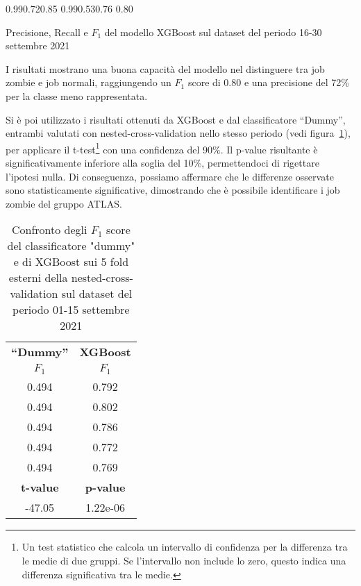 \begin{table}[!ht]
   \centering
   \scores%
   {0.99}{0.72}{0.85}%
   {0.99}{0.53}{0.76}%
   {0.80}
   \caption{\small Precisione, Recall e $F_1$ del modello XGBoost sul dataset del
   periodo 16-30 settembre 2021}
   \label{table:scores_xgboost_sep2021}
\end{table}

I risultati mostrano una buona capacità del modello nel distinguere tra job
zombie e job normali, raggiungendo un $F_1$ score di 0.80 e una precisione del
72\% per la classe meno rappresentata. 

Si è poi utilizzato i risultati ottenuti da XGBoost e dal classificatore
``Dummy'', entrambi valutati con nested-cross-validation nello stesso periodo
(vedi figura~\ref{table:nested_cv_f1_scores_sep2021}), per applicare il
t-test\footnote{Un test statistico che calcola un intervallo di confidenza per
la differenza tra le medie di due gruppi. Se l'intervallo non include lo zero,
questo indica una differenza significativa tra le medie.} con una confidenza
del 90\%. Il p-value risultante è significativamente inferiore alla soglia del
10\%, permettendoci di rigettare l'ipotesi nulla. Di conseguenza, possiamo
affermare che le differenze osservate sono statisticamente significative,
dimostrando che è possibile identificare i job zombie del gruppo ATLAS.

\begin{table}[!ht]
    \centering
    \begin{tabular}{cc}
        \toprule
        \textbf{``Dummy''} & \textbf{XGBoost} \\  
        $F_1$ & $F_1$ \\ 
        \midrule
        0.494 & 0.792 \\
        0.494 & 0.802 \\
        0.494 & 0.786 \\
        0.494 & 0.772 \\
        0.494 & 0.769 \\
        \midrule 
        \textbf{t-value} & \textbf{p-value} \\ 
        \midrule
        -47.05 & 1.22e-06 \\
        \bottomrule
    \end{tabular}
    \caption{\small Confronto degli $F_1$ score del classificatore "dummy" e
    di XGBoost sui 5 fold esterni della nested-cross-validation sul dataset
del periodo 01-15 settembre 2021}
    \label{table:nested_cv_f1_scores_sep2021}
\end{table}

